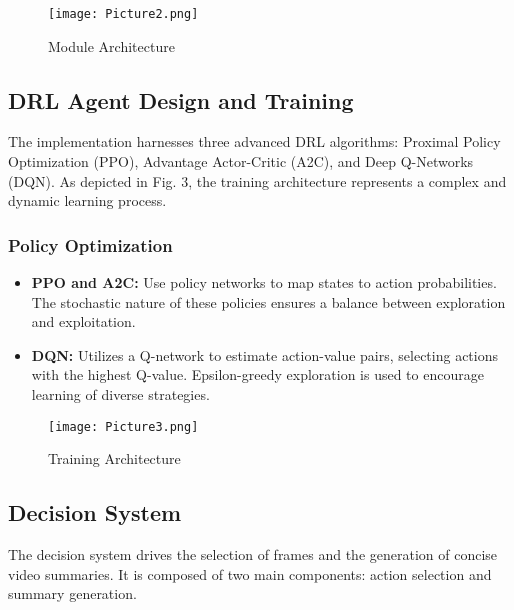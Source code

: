 \documentclass[conference]{IEEEtran}
\begin{document}
\begin{figure}[htbp]
\centerline{\texttt{[image: Picture2.png]}}
\caption{Module Architecture}
\label{fig}
\end{figure}

\subsection{\textbf{DRL Agent Design and Training}}
The implementation harnesses three advanced DRL algorithms: Proximal Policy Optimization (PPO), Advantage Actor-Critic (A2C), and Deep Q-Networks (DQN). As depicted in Fig. 3, the training architecture represents a complex and dynamic learning process.
\subsubsection{\textbf{Policy Optimization}}
\begin{itemize}
\item \textbf{PPO and A2C:} Use policy networks to map states to action probabilities. The stochastic nature of these policies ensures a balance between exploration and exploitation.
\item \textbf{DQN:} Utilizes a Q-network to estimate action-value pairs, selecting actions with the highest Q-value. Epsilon-greedy exploration is used to encourage learning of diverse strategies.
\end{itemize}

\begin{figure}[htbp]
\centerline{\texttt{[image: Picture3.png]}}
\caption{Training Architecture}
\label{fig}
\end{figure}


\subsection{\textbf{Decision System}}
The decision system drives the selection of frames and the generation of concise video summaries. It is composed of two main components: action selection and summary generation.
\end{document}
